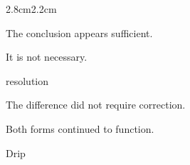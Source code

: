 \begin{adjustwidth}{2.8cm}{2.2cm}

The conclusion appears sufficient.

\medskip

It is not necessary.

\vspace{2em}


\medskip

resolution

\vspace{2em}

The difference did not require correction.

\medskip

Both forms continued to function.

\vspace{3em}

\end{adjustwidth}

\begin{center}
\end{center}

\vspace{3em}

\begin{center}
Drip
\end{center}

\vspace{2em}

\begin{center}
\end{center}

